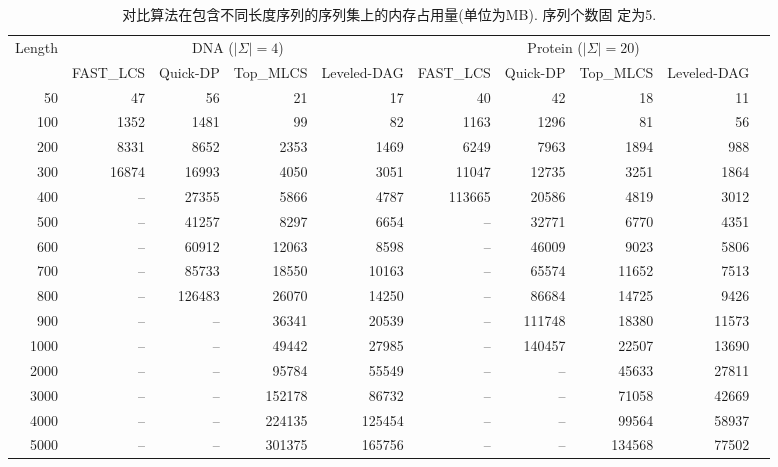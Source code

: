 \documentclass[utf8]{frontiersSCNS} %
\begin{document}
\begin{table*}[htp]
  \footnotesize
  \caption{对比算法在包含不同长度序列的序列集上的内存占用量(单位为MB). 序列个数固
    定为5.}
  \label{tab:memory2}
  \begin{tabular}{|r|r|r|r|r|r|r|r|r|r|}
     \hline
    Length &
    \multicolumn{4}{c|}{DNA ($|\Sigma|=4$)} & \multicolumn{4}{c|}{Protein ($|\Sigma|=20$)}\\
    \cline{2-9}
     & FAST\_LCS & Quick-DP & Top\_MLCS & Leveled-DAG & FAST\_LCS & Quick-DP & Top\_MLCS & Leveled-DAG \\
    \hline
    50   & 47     & 56      & 21      & 17      & 40      & 42       & 18     & 11     \\
    100  & 1352   & 1481    & 99      & 82      & 1163    & 1296     & 81     & 56     \\
    200  & 8331   & 8652    & 2353    & 1469    & 6249    & 7963     & 1894   & 988   \\
    300  & 16874  & 16993   & 4050    & 3051    & 11047   & 12735    & 3251   & 1864  \\
    400  & --     & 27355   & 5866    & 4787    & 113665  & 20586    & 4819   & 3012  \\
    500  & --     & 41257   & 8297    & 6654    & --      & 32771    & 6770   & 4351   \\
    600  & --     & 60912   & 12063   & 8598    & --      & 46009    & 9023   & 5806   \\
    700  & --     & 85733   & 18550   & 10163   & --      & 65574    & 11652  & 7513   \\
    800  & --     & 126483  & 26070   & 14250   & --      & 86684    & 14725  & 9426   \\
    900  & --     & --      & 36341   & 20539   & --      & 111748   & 18380  & 11573  \\

    1000 & --     & --      & 49442   & 27985   & --      & 140457   & 22507  & 13690  \\
    2000 & --     & --      & 95784   & 55549   & --      & --       & 45633  & 27811  \\
    3000 & --     & --      & 152178  & 86732   & --      & --       & 71058  & 42669  \\
    4000 & --     & --      & 224135  & 125454  & --      & --       & 99564  & 58937 \\
    5000 & --     & --      & 301375  & 165756  & --      & --       & 134568 & 77502 \\
    \hline
  \end{tabular}
\end{table*}
\end{document}
